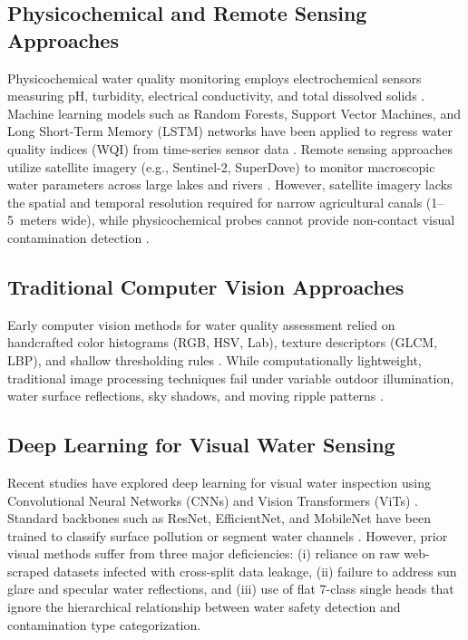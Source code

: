 \documentclass[journal]{IEEEtran}
\begin{document}
\subsection{Physicochemical and Remote Sensing Approaches}
Physicochemical water quality monitoring employs electrochemical sensors measuring pH, turbidity, electrical conductivity, and total dissolved solids \cite{low_cost_ml_water_2024, cnt_sensor_water_2023}. Machine learning models such as Random Forests, Support Vector Machines, and Long Short-Term Memory (LSTM) networks have been applied to regress water quality indices (WQI) from time-series sensor data \cite{sw3t_iot_water_2024, wqi_semiarid_2024}. Remote sensing approaches utilize satellite imagery (e.g., Sentinel-2, SuperDove) to monitor macroscopic water parameters across large lakes and rivers \cite{superdove_water_2023}. However, satellite imagery lacks the spatial and temporal resolution required for narrow agricultural canals (1--5~meters wide), while physicochemical probes cannot provide non-contact visual contamination detection \cite{online_water_monitoring_2023}.

\subsection{Traditional Computer Vision Approaches}
Early computer vision methods for water quality assessment relied on handcrafted color histograms (RGB, HSV, Lab), texture descriptors (GLCM, LBP), and shallow thresholding rules \cite{cctv_irrigation_2023}. While computationally lightweight, traditional image processing techniques fail under variable outdoor illumination, water surface reflections, sky shadows, and moving ripple patterns \cite{gis_ml_coastal_2023}.

\subsection{Deep Learning for Visual Water Sensing}
Recent studies have explored deep learning for visual water inspection using Convolutional Neural Networks (CNNs) and Vision Transformers (ViTs) \cite{drone_pollution_2024, towards_precision_agri_2024}. Standard backbones such as ResNet, EfficientNet, and MobileNet have been trained to classify surface pollution or segment water channels \cite{cctv_irrigation_2023}. However, prior visual methods suffer from three major deficiencies: (i) reliance on raw web-scraped datasets infected with cross-split data leakage, (ii) failure to address sun glare and specular water reflections, and (iii) use of flat 7-class single heads that ignore the hierarchical relationship between water safety detection and contamination type categorization.
\end{document}
